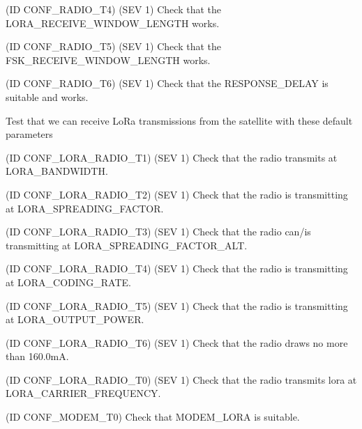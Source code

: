 \begin{DoxyRefList}
(ID C\+O\+N\+F\+\_\+\+R\+A\+D\+I\+O\+\_\+\+T4) (S\+EV 1) Check that the L\+O\+R\+A\+\_\+\+R\+E\+C\+E\+I\+V\+E\+\_\+\+W\+I\+N\+D\+O\+W\+\_\+\+L\+E\+N\+G\+TH works. 

(ID C\+O\+N\+F\+\_\+\+R\+A\+D\+I\+O\+\_\+\+T5) (S\+EV 1) Check that the F\+S\+K\+\_\+\+R\+E\+C\+E\+I\+V\+E\+\_\+\+W\+I\+N\+D\+O\+W\+\_\+\+L\+E\+N\+G\+TH works. 

(ID C\+O\+N\+F\+\_\+\+R\+A\+D\+I\+O\+\_\+\+T6) (S\+EV 1) Check that the R\+E\+S\+P\+O\+N\+S\+E\+\_\+\+D\+E\+L\+AY is suitable and works. 
\item[\label{test__test000026}%
\Hypertarget{test__test000026}%
Module \hyperlink{group__defines__radio__lora__configuration}{defines\+\_\+radio\+\_\+lora\+\_\+configuration} ]Test that we can receive Lo\+Ra transmissions from the satellite with these default parameters 

(ID C\+O\+N\+F\+\_\+\+L\+O\+R\+A\+\_\+\+R\+A\+D\+I\+O\+\_\+\+T1) (S\+EV 1) Check that the radio transmits at L\+O\+R\+A\+\_\+\+B\+A\+N\+D\+W\+I\+D\+TH. 

(ID C\+O\+N\+F\+\_\+\+L\+O\+R\+A\+\_\+\+R\+A\+D\+I\+O\+\_\+\+T2) (S\+EV 1) Check that the radio is transmitting at L\+O\+R\+A\+\_\+\+S\+P\+R\+E\+A\+D\+I\+N\+G\+\_\+\+F\+A\+C\+T\+OR. 

(ID C\+O\+N\+F\+\_\+\+L\+O\+R\+A\+\_\+\+R\+A\+D\+I\+O\+\_\+\+T3) (S\+EV 1) Check that the radio can/is transmitting at L\+O\+R\+A\+\_\+\+S\+P\+R\+E\+A\+D\+I\+N\+G\+\_\+\+F\+A\+C\+T\+O\+R\+\_\+\+A\+LT. 

(ID C\+O\+N\+F\+\_\+\+L\+O\+R\+A\+\_\+\+R\+A\+D\+I\+O\+\_\+\+T4) (S\+EV 1) Check that the radio is transmitting at L\+O\+R\+A\+\_\+\+C\+O\+D\+I\+N\+G\+\_\+\+R\+A\+TE. 

(ID C\+O\+N\+F\+\_\+\+L\+O\+R\+A\+\_\+\+R\+A\+D\+I\+O\+\_\+\+T5) (S\+EV 1) Check that the radio is transmitting at L\+O\+R\+A\+\_\+\+O\+U\+T\+P\+U\+T\+\_\+\+P\+O\+W\+ER. 

(ID C\+O\+N\+F\+\_\+\+L\+O\+R\+A\+\_\+\+R\+A\+D\+I\+O\+\_\+\+T6) (S\+EV 1) Check that the radio draws no more than 160.\+0mA.

(ID C\+O\+N\+F\+\_\+\+L\+O\+R\+A\+\_\+\+R\+A\+D\+I\+O\+\_\+\+T0) (S\+EV 1) Check that the radio transmits lora at L\+O\+R\+A\+\_\+\+C\+A\+R\+R\+I\+E\+R\+\_\+\+F\+R\+E\+Q\+U\+E\+N\+CY.  
\item[\label{test__test000030}%
\Hypertarget{test__test000030}%
Module \hyperlink{group__defines__radio__modem__configuration}{defines\+\_\+radio\+\_\+modem\+\_\+configuration} ](ID C\+O\+N\+F\+\_\+\+M\+O\+D\+E\+M\+\_\+\+T0) Check that M\+O\+D\+E\+M\+\_\+\+L\+O\+RA is suitable. 


\end{DoxyRefList}
